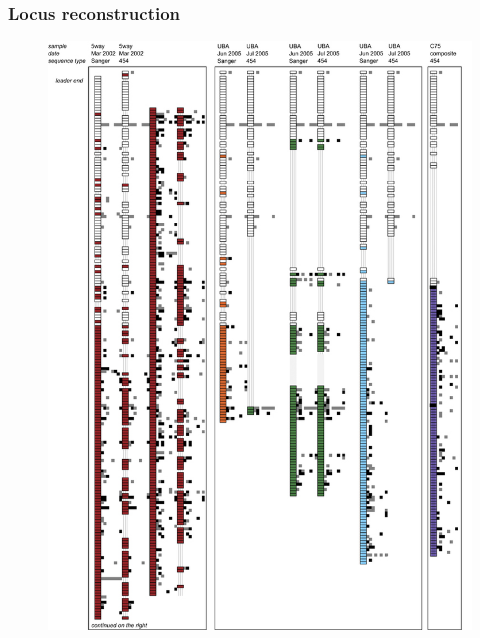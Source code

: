 \documentclass[10pt]{beamer}
\begin{document}
\begin{frame}[fragile]
	\frametitle{Locus reconstruction}
    \begin{figure}
    		\includegraphics[width=\textwidth,height=0.9\textheight,keepaspectratio]{ismej_fig2.jpg}
    \end{figure}

\end{frame}
\end{document}

